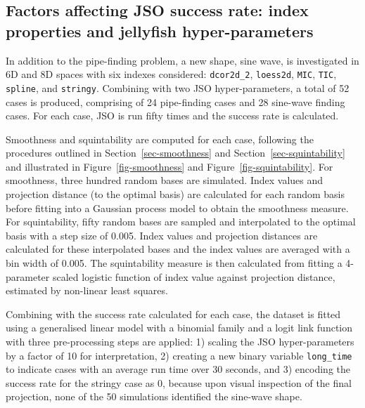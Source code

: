 \documentclass[
  number,
  preprint,
  3p]{elsarticle}
\begin{document}
\subsection{Factors affecting JSO success rate: index properties and
jellyfish hyper-parameters}\label{sec-app-2}

In addition to the pipe-finding problem, a new shape, sine wave, is
investigated in 6D and 8D spaces with six indexes considered:
\texttt{dcor2d\_2}, \texttt{loess2d}, \texttt{MIC}, \texttt{TIC},
\texttt{spline}, and \texttt{stringy}. Combining with two JSO
hyper-parameters, a total of 52 cases is produced, comprising of 24
pipe-finding cases and 28 sine-wave finding cases. For each case, JSO is
run fifty times and the success rate is calculated.

Smoothness and squintability are computed for each case, following the
procedures outlined in Section~\ref{sec-smoothness} and
Section~\ref{sec-squintability} and illustrated in
Figure~\ref{fig-smoothness} and Figure~\ref{fig-squintability}. For
smoothness, three hundred random bases are simulated. Index values and
projection distance (to the optimal basis) are calculated for each
random basis before fitting into a Gaussian process model to obtain the
smoothness measure. For squintability, fifty random bases are sampled
and interpolated to the optimal basis with a step size of 0.005. Index
values and projection distances are calculated for these interpolated
bases and the index values are averaged with a bin width of 0.005. The
squintability measure is then calculated from fitting a 4-parameter
scaled logistic function of index value against projection distance,
estimated by non-linear least squares.

Combining with the success rate calculated for each case, the dataset is
fitted using a generalised linear model with a binomial family and a
logit link function with three pre-processing steps are applied: 1)
scaling the JSO hyper-parameters by a factor of 10 for interpretation,
2) creating a new binary variable \texttt{long\_time} to indicate cases
with an average run time over 30 seconds, and 3) encoding the success
rate for the stringy case as 0, because upon visual inspection of the
final projection, none of the 50 simulations identified the sine-wave
shape.
\end{document}
